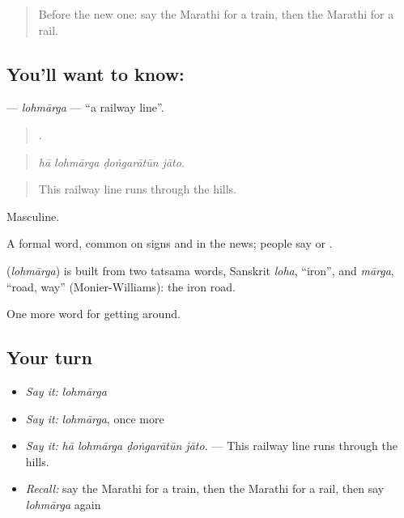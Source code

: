 \label{lesson:MR-C396-lohmarga}



\begin{quote}
Before the new one: say the Marathi for a train, then the Marathi for a rail.
\end{quote}

\subsection*{You'll want to know: }
\textbf{} — \emph{lohmārga} — \textquotedblleft{}a railway line\textquotedblright{}.

\begin{quote}
   .
\end{quote}

\begin{quote}
\emph{hā lohmārga ḍoṅgarātūn jāto.}
\end{quote}

\begin{quote}
This railway line runs through the hills.
\end{quote}

Masculine.

A formal word, common on signs and in the news; people say  or  .

\begin{cousinweb}
\textbf{} (\emph{lohmārga}) is built from two tatsama words, Sanskrit \emph{loha}, \textquotedblleft{}iron\textquotedblright{}, and \emph{mārga}, \textquotedblleft{}road, way\textquotedblright{} (Monier-Williams): the iron road.
\end{cousinweb}

\begin{grammarlens}[title={What you've built}]
One more word for getting around.
\end{grammarlens}

\subsection*{Your turn}
\begin{itemize}
\raggedright
  \item \emph{Say it:} \emph{lohmārga}
  \item \emph{Say it:} \emph{lohmārga}, once more
  \item \emph{Say it:} \emph{hā lohmārga ḍoṅgarātūn jāto.} — This railway line runs through the hills.
  \item \emph{Recall:} say the Marathi for a train, then the Marathi for a rail, then say \emph{lohmārga} again
\end{itemize}

